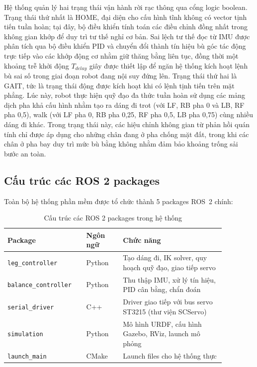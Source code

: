 Hệ thống quản lý hai trạng thái vận hành rời rạc thông qua cổng logic boolean. Trạng thái thứ nhất là HOME, đại diện cho cấu hình tĩnh không có vector tịnh tiến tuần hoàn; tại đây, bộ điều khiển tính toán các điều chỉnh đồng nhất trong không gian khớp để duy trì tư thế nghỉ cơ bản. Sai lệch tư thế đọc từ IMU được phân tích qua bộ điều khiển PID và chuyển đổi thành tín hiệu bù góc tác động trực tiếp vào các khớp động cơ nhằm giữ thăng bằng liên tục, đồng thời một khoảng trễ khởi động $T_{delay}$ giây được thiết lập để ngăn hệ thống kích hoạt lệnh bù sai số trong giai đoạn robot đang nội suy đứng lên. Trạng thái thứ hai là GAIT, tức là trạng thái động được kích hoạt khi có lệnh tịnh tiến trên mặt phẳng. Lúc này, robot thực hiện quỹ đạo đa thức tuần hoàn sử dụng các mảng dịch pha khả cấu hình nhằm tạo ra dáng đi trot (với LF, RB pha 0 và LB, RF pha 0,5), walk (với LF pha 0, RB pha 0,25, RF pha 0,5, LB pha 0,75) cùng nhiều dáng đi khác. Trong trạng thái này, các hiệu chỉnh không gian từ phản hồi quán tính chỉ được áp dụng cho những chân đang ở pha chống mặt đất, trong khi các chân ở pha bay duy trì mức bù bằng không nhằm đảm bảo khoảng trống sải bước an toàn.

\subsection{Cấu trúc các ROS 2 packages}

Toàn bộ hệ thống phần mềm được tổ chức thành 5 packages ROS~2 chính:

\begin{table}[H]
\centering
\caption{Cấu trúc các ROS 2 packages trong hệ thống}
\label{tab:ros2_packages}
\renewcommand{\arraystretch}{1.3}
\begin{tabular}{|p{0.30\linewidth}|p{0.15\linewidth}|p{0.42\linewidth}|}
\hline
\textbf{Package} & \textbf{Ngôn ngữ} & \textbf{Chức năng} \\ \hline
\texttt{leg\_controller} & Python & Tạo dáng đi, IK solver, quy hoạch quỹ đạo, giao tiếp servo \\ \hline
\texttt{balance\_controller} & Python & Thu thập IMU, xử lý tín hiệu, PID cân bằng, chẩn đoán \\ \hline
\texttt{serial\_driver} & C++ & Driver giao tiếp với bus servo ST3215 (thư viện SCServo) \\ \hline
\texttt{simulation} & Python & Mô hình URDF, cấu hình Gazebo, RViz, launch mô phỏng \\ \hline
\texttt{launch\_main} & CMake & Launch files cho hệ thống thực \\ \hline
\end{tabular}
\end{table}

